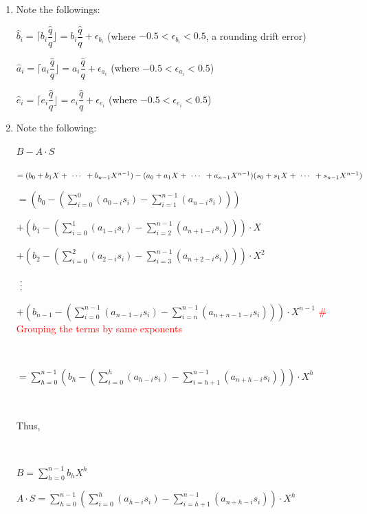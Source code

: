 \begin{enumerate}
\item Note the followings: 

$\hat{b}_i = \Big\lceil b_i \dfrac{\hat{q}}{q} \Big\rfloor = b_i\dfrac{\hat{q}}{q} + \epsilon_{b_i}$ (where $-0.5 < \epsilon_{b_i} < 0.5$, a rounding drift error)

$\hat{a}_i = \Big\lceil a_i \dfrac{\hat{q}}{q} \Big\rfloor = a_i\dfrac{\hat{q}}{q} + \epsilon_{a_i}$ (where $-0.5 < \epsilon_{a_i} < 0.5$)

$\hat{e}_i = \Big\lceil e_i \dfrac{\hat{q}}{q} \Big\rfloor = e_i\dfrac{\hat{q}}{q} + \epsilon_{e_i}$ (where $-0.5 < \epsilon_{e_i} < 0.5$)

\item Note the following: 


$B - A\cdot S$ 

$ = (b_0 + b_1X + \text{ } \text{$\cdots$} \text{ } + b_{n-1}X^{n-1} ) - (a_{0} + a_{1}X + \text{ } \text{$\cdots$} \text{ } + a_{n-1}X^{n-1})(s_{0} + s_{1}X + \text{ } \text{$\cdots$} \text{ } + s_{n-1}X^{n-1})$ 


$ = \left(b_0 - \left( \sum\limits_{i=0}^{0}(a_{0-i}s_{i}) - \sum\limits_{i=1}^{n-1}(a_{n-i}s_{i}) \right)\right)$

$ + \left(b_1 - \left( \sum\limits_{i=0}^{1}(a_{1-i}s_{i}) - \sum\limits_{i=2}^{n-1}(a_{n+1-i}s_{i})   \right) \right)\cdot X$ 



$ + \left(b_2 - \left( \sum\limits_{i=0}^{2}(a_{2-i}s_{i}) - \sum\limits_{i=3}^{n-1}(a_{n+2-i}s_{i})   \right) \right)\cdot X^2$ 


$\text{ } \text{$\vdots$} \text{ }$ 


$ + \left(b_{n-1} - \left(  \sum\limits_{i=0}^{n-1}(a_{n-1-i}s_{i}) -  \sum\limits_{i=n}^{n-1}(a_{n+n-1-i}s_{i})  \right) \right)\cdot X^{n-1}$ \textcolor{red}{\# Grouping the terms by same exponents}

$ $

$= \sum\limits_{h=0}^{n-1}  \left(b_h - \left( \sum\limits_{i=0}^{h}(a_{h-i}s_{i}) -  \sum\limits_{i=h+1}^{n-1}(a_{n+h-i}s_{i})  \right) \right)\cdot X^{h}  $

$ $

Thus,

$ $

$B = \sum\limits_{h=0}^{n-1}  b_h  X^{h}  $

$A\cdot S = \sum\limits_{h=0}^{n-1}  \left(\sum\limits_{i=0}^{h}(a_{h-i}s_{i}) - \sum\limits_{i=h+1}^{n-1}(a_{n+h-i}s_{i}) \right)\cdot X^{h}  $



\end{enumerate}
